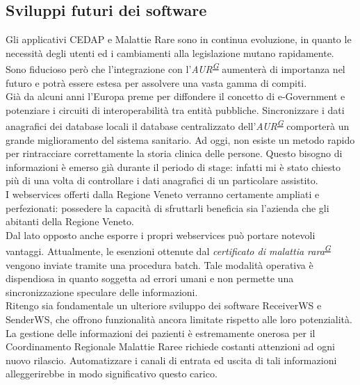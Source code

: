 \documentclass[a4paper]{article}
\newcommand{\crmr}{Coordinamento Regionale Malattie Rare}
\begin{document}
\subsection{Sviluppi futuri dei software}
Gli applicativi CEDAP e Malattie Rare sono in continua evoluzione, in quanto le necessità degli utenti ed i cambiamenti alla legislazione mutano rapidamente. Sono fiducioso però che l'integrazione con l'\textit{AUR\textsuperscript{\hyperref[sec:gl]{G}}} aumenterà di importanza nel futuro e potrà essere estesa per assolvere una vasta gamma di compiti.
\\
Già da alcuni anni l'Europa preme per diffondere il concetto di e-Government e potenziare i circuiti di interoperabilità tra entità pubbliche. Sincronizzare i dati anagrafici dei database locali il database centralizzato dell'\textit{AUR\textsuperscript{\hyperref[sec:gl]{G}}} comporterà un grande miglioramento del sistema sanitario. Ad oggi, non esiste un metodo rapido per rintracciare correttamente la storia clinica delle persone. Questo bisogno di informazioni è emerso già durante il periodo di stage: infatti mi è stato chiesto più di una volta di controllare i dati anagrafici di un particolare assistito.
\\
I webservices offerti dalla Regione Veneto verranno certamente ampliati e perfezionati: possedere la capacità di sfruttarli beneficia sia l'azienda che gli abitanti della Regione Veneto.
\\
Dal lato opposto anche esporre i propri webservices può portare notevoli vantaggi. Attualmente, le esenzioni ottenute dal \textit{certificato di malattia rara\textsuperscript{\hyperref[sec:gl]{G}}} vengono inviate tramite una procedura batch. Tale modalità operativa è dispendiosa in quanto soggetta ad errori umani e non permette una sincronizzazione speculare delle informazioni.
\\
Ritengo sia fondamentale un ulteriore sviluppo dei software ReceiverWS e SenderWS, che offrono funzionalità ancora limitate rispetto alle loro potenzialità. La gestione delle informazioni dei pazienti è estremamente onerosa per il \crmr e richiede costanti attenzioni ad ogni nuovo rilascio. Automatizzare i canali di entrata ed uscita di tali informazioni alleggerirebbe in modo significativo questo carico.
\end{document}
